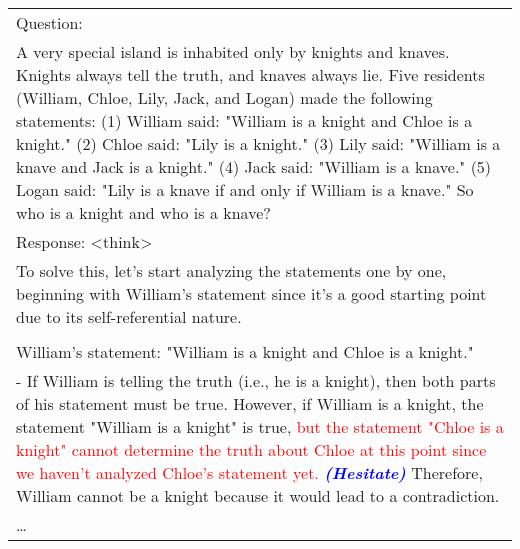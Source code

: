 \begin{table}[H]
\centering
\fontsize{9}{10}\selectfont
\begin{tabular}{p{14cm}}
\toprule
Question: \\
A very special island is inhabited only by knights and knaves. Knights always tell the truth, and knaves always lie. Five residents (William, Chloe, Lily, Jack, and Logan) made the following statements: (1) William said: "William is a knight and Chloe is a knight." (2) Chloe said: "Lily is a knight." (3) Lily said: "William is a knave and Jack is a knight." (4) Jack said: "William is a knave." (5) Logan said: "Lily is a knave if and only if William is a knave." So
who is a knight and who is a knave? \\
\midrule
Response: <think> \\
To solve this, let's start analyzing the statements one by one, beginning with William's statement since it's a good starting point due to its self-referential nature. \\
\\
William's statement: "William is a knight and Chloe is a knight." \\
   - If William is telling the truth (i.e., he is a knight), then both parts of his statement must be true. However, if William is a knight, the statement "William is a knight" is true, \textcolor{red}{but the statement "Chloe is a knight" cannot determine the truth about Chloe at this point since we haven't analyzed Chloe's statement yet.}\textcolor{blue}{\textit{\textbf{ (Hesitate)}}
} Therefore, William cannot be a knight because it would lead to a contradiction. \\
\ldots \\

   

\end{tabular}
\end{table}
